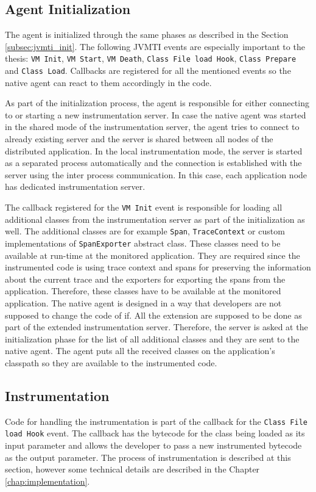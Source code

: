 \subsection{Agent Initialization}
The agent is initialized through the same phases as described in the Section \ref{subsec:jvmti_init}. The following JVMTI events are especially important to the thesis: \texttt{VM Init}, \texttt{VM Start}, \texttt{VM Death}, \texttt{Class File load Hook}, \texttt{Class Prepare} and \texttt{Class Load}. Callbacks are registered for all the mentioned events so the native agent can react to them accordingly in the code.

As part of the initialization process, the agent is responsible for either connecting to or starting a new instrumentation server. In case the native agent was started in the shared mode of the instrumentation server, the agent tries to connect to already existing server and the server is shared between all  nodes of the distributed application. In the local instrumentation mode, the server is started as a separated process automatically and the connection is established with the server using the inter process communication. In this case, each application node has dedicated instrumentation server.

The callback registered for the \texttt{VM Init} event is responsible for loading all additional classes from the instrumentation server as part of the initialization as well. The additional classes are for example \texttt{Span}, \texttt{TraceContext} or custom implementations of \texttt{SpanExporter} abstract class. These classes need to be available at run-time at the monitored application. They are required since the instrumented code is using trace context and spans for preserving the information about the current trace and the exporters for exporting the spans from the application. Therefore, these classes have to be available at the monitored application. The native agent is designed in a way that developers are not supposed to change the code of if. All the extension are supposed to be done as part of the extended instrumentation server. Therefore, the server is asked at the initialization phase for the list of all additional classes and they are sent to the native agent. The agent puts all the received classes on the application's classpath so they are available to the instrumented code.

\subsection{Instrumentation}
Code for handling the instrumentation is part of the callback for the \texttt{Class File load Hook} event. The callback has the bytecode for the class being loaded as its input parameter and allows the developer to pass a new instrumented bytecode as the output parameter. The process of instrumentation is described at this section, however some technical details are described in the Chapter \ref{chap:implementation}.


